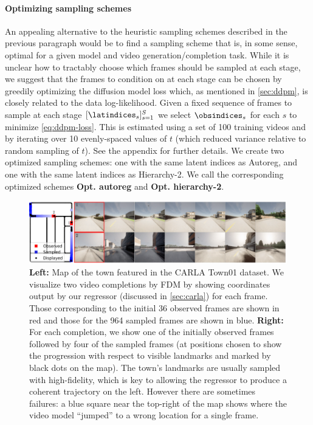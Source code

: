 \paragraph{Optimizing sampling schemes}
An appealing alternative to the heuristic sampling schemes described in the previous paragraph would be to find a sampling scheme that is, in some sense, optimal for a given model and video generation/completion task. While it is unclear how to tractably choose which frames should be sampled at each stage, we suggest that the frames to condition on at each stage can be chosen by greedily optimizing the diffusion model loss which, as mentioned in \cref{sec:ddpm}, is closely related to the data log-likelihood. Given a fixed sequence of frames to sample at each stage $[\latindices_s]_{s=1}^S$ we select $\obsindices_s$ for each $s$ to minimize \cref{eq:ddpm-loss}. This is estimated using a set of 100 training videos and by iterating over 10 evenly-spaced values of $t$ (which reduced variance relative to random sampling of $t$). See the appendix for further details. We create two optimized sampling schemes: one with the same latent indices as Autoreg, and one with the same latent indices as Hierarchy-2. We call the corresponding optimized schemes \textbf{Opt. autoreg} and \textbf{Opt. hierarchy-2}.


\begin{figure}
    \centering
    \includegraphics[width=1\textwidth]{figs/fdm/carla_map_7panel}
    \caption{\textbf{Left:} Map of the town featured in the CARLA Town01 dataset. We visualize two video completions by FDM by showing coordinates output by our regressor (discussed in \cref{sec:carla}) for each frame. Those corresponding to the initial 36 observed frames are shown in red and those for the 964 sampled frames are shown in blue. \textbf{Right:} For each completion, we show one of the initially observed frames followed by four of the sampled frames (at positions chosen to show the progression with respect to visible landmarks and marked by black dots on the map). The town's landmarks are usually sampled with high-fidelity, which is key to allowing the regressor  to produce a coherent trajectory on the left. However there are sometimes failures: a blue square near the top-right of the map shows where the video model ``jumped'' to a wrong location for a single frame.}
    \label{fig:carla}
\end{figure}


